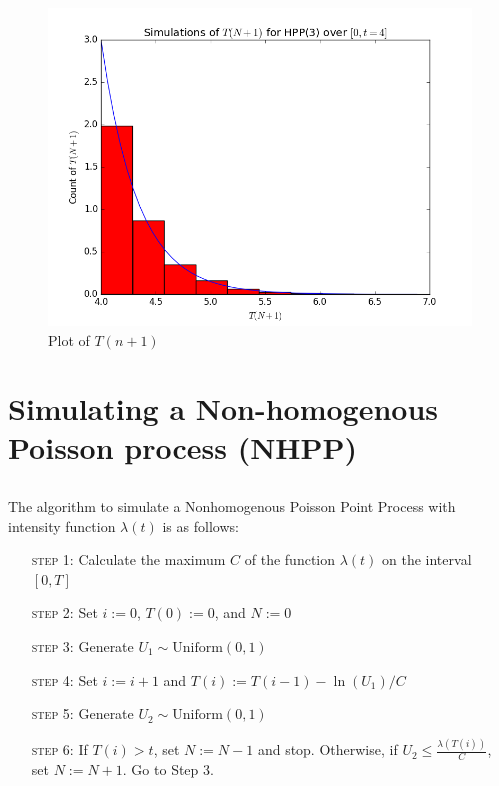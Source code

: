 \documentclass[11pt, oneside]{article}   	%
\begin{document}
\subsubsection{}
\begin{figure}[H]
\includegraphics[scale=.5]{hpp_tn1}
\caption{Plot of $T(n+1)$}
\label{fig:x}
\end{figure}

\section{Simulating a Non-homogenous Poisson process (NHPP)}
\subsection{}
The algorithm to simulate a Nonhomogenous Poisson Point Process with intensity function $\lambda(t)$ is as follows:
\begin{enumerate}[leftmargin=30pt,labelindent=65pt,itemindent=30pt]
\item[\textsc{step 1:}] Calculate the maximum $C$ of the function $\lambda(t)$ on the interval $[0,T]$
\item[\textsc{step 2:}] Set $i:=0$, $T(0):=0$, and $N:=0$
\item[\textsc{step 3:}] Generate $U_1 \sim \text{Uniform}(0,1)$
\item[\textsc{step 4:}] Set $i:=i+1$ and $T(i) := T(i-1) - \ln(U_1)/C$
\item[\textsc{step 5:}] Generate $U_2 \sim\text{Uniform}(0,1)$
\item[\textsc{step 6:}] If $T(i) > t$, set $N:=N-1$ and stop. Otherwise, if $U_2 \leq \frac{\lambda(T(i))}{C}$, set $N:=N+1$. Go to Step 3.
\end{enumerate}
\end{document}
